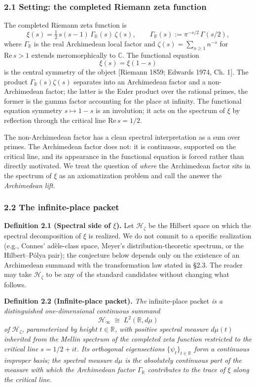 \documentclass[
  letterpaper,
  11pt]{article}
\theoremstyle{plain}
\theoremstyle{definition}
\theoremstyle{remark}
\begin{document}
\subsubsection{2.1 Setting: the completed Riemann zeta function}\label{setting-the-completed-riemann-zeta-function}

The completed Riemann zeta function is
\[\xi(s) = \tfrac{1}{2}\,s(s-1)\,\Gamma_{\mathbb{R}}(s)\,\zeta(s), \qquad \Gamma_{\mathbb{R}}(s) := \pi^{-s/2}\,\Gamma(s/2),\]
where \(\Gamma_{\mathbb{R}}\) is the real Archimedean local factor and \(\zeta(s) = \sum_{n \geq 1} n^{-s}\) for \(\mathrm{Re}\,s > 1\) extends meromorphically to \(\mathbb{C}\). The functional equation
\[\xi(s) = \xi(1-s)\]
is the central symmetry of the object {[}Riemann 1859; Edwards 1974, Ch. 1{]}. The product \(\Gamma_{\mathbb{R}}(s)\zeta(s)\) separates into an Archimedean factor and a non-Archimedean factor; the latter is the Euler product over the rational primes, the former is the gamma factor accounting for the place at infinity. The functional equation symmetry \(s \mapsto 1-s\) is an involution; it acts on the spectrum of \(\xi\) by reflection through the critical line \(\mathrm{Re}\,s = 1/2\).

The non-Archimedean factor has a clean spectral interpretation as a sum over primes. The Archimedean factor does not: it is continuous, supported on the critical line, and its appearance in the functional equation is forced rather than directly motivated. We treat the question of \emph{where} the Archimedean factor sits in the spectrum of \(\xi\) as an axiomatization problem and call the answer the \emph{Archimedean lift}.

\subsubsection{2.2 The infinite-place packet}\label{the-infinite-place-packet}

\textbf{Definition 2.1 (Spectral side of \(\xi\)).} Let \(\mathcal{H}_\zeta\) be the Hilbert space on which the spectral decomposition of \(\xi\) is realized. We do not commit to a specific realization (e.g., Connes' adèle-class space, Meyer's distribution-theoretic spectrum, or the Hilbert--Pólya pair); the conjecture below depends only on the existence of an Archimedean summand with the transformation law stated in §2.3. The reader may take \(\mathcal{H}_\zeta\) to be any of the standard candidates without changing what follows.

\textbf{Definition 2.2 (Infinite-place packet).} \emph{The} infinite-place packet \emph{is a distinguished one-dimensional continuous summand}
\[\mathcal{H}_\infty \;\cong\; L^2(\mathbb{R}, d\mu)\]
\emph{of \(\mathcal{H}_\zeta\), parameterized by height \(t \in \mathbb{R}\), with positive spectral measure \(d\mu(t)\) inherited from the Mellin spectrum of the completed zeta function restricted to the critical line \(s = 1/2 + it\). Its orthogonal eigensections \(\{\psi_t\}_{t \in \mathbb{R}}\) form a continuous improper basis; the spectral measure \(d\mu\) is the absolutely continuous part of the measure with which the Archimedean factor \(\Gamma_{\mathbb{R}}\) contributes to the trace of \(\xi\) along the critical line.}
\end{document}
